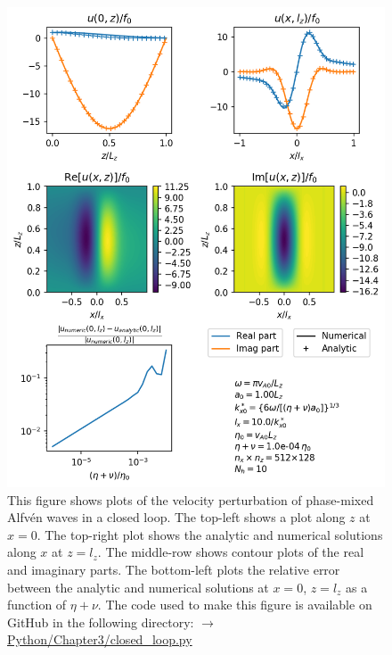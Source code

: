 \begin{figure}
    \centering
    \vspace{-20pt}
    \includegraphics[width=\textwidth,height=0.85\textheight,keepaspectratio]{figures/chapter03/phase_mixing_closed_loop.png}
    \vspace{-10pt}
    \caption{This figure shows plots of the velocity perturbation of phase-mixed Alfv\'en waves in a closed loop. The top-left shows a plot along $z$ at $x=0$. The top-right plot shows the analytic and numerical solutions along $x$ at $z=l_z$. The middle-row shows contour plots of the real and imaginary parts. The bottom-left plots the relative error between the analytic and numerical solutions at $x=0$, $z=l_z$ as a function of $\eta+\nu$. The code used to make this figure is available on GitHub in the following directory:\newline
    \href{https://github.com/aleksyprok/apkp_thesis/blob/main/Python/Chapter3/closed_loop.py}{$\rightarrow$ Python/Chapter3/closed\_loop.py}}
    \label{fig:phase_mixing_closed_loop}
    \vspace{-30pt}
\end{figure}
 

